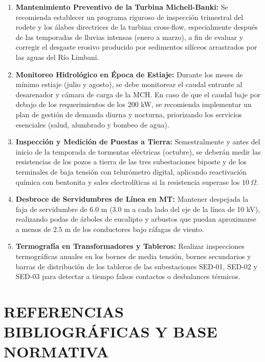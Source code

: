 \begin{enumerate}
  \item \textbf{Mantenimiento Preventivo de la Turbina Michell-Banki:} Se recomienda establecer un programa riguroso de inspección trimestral del rodete y los álabes directrices de la turbina cross-flow, especialmente después de las temporadas de lluvias intensas (enero a marzo), a fin de evaluar y corregir el desgaste erosivo producido por sedimentos silíceos arrastrados por las aguas del Río Limbani.
  \item \textbf{Monitoreo Hidrológico en Época de Estiaje:} Durante los meses de mínimo estiaje (julio y agosto), se debe monitorear el caudal entrante al desarenador y cámara de carga de la MCH. En caso de que el caudal baje por debajo de los requerimientos de los 200 kW, se recomienda implementar un plan de gestión de demanda diurna y nocturna, priorizando los servicios esenciales (salud, alumbrado y bombeo de agua).
  \item \textbf{Inspección y Medición de Puestas a Tierra:} Semestralmente y antes del inicio de la temporada de tormentas eléctricas (octubre), se deberán medir las resistencias de los pozos a tierra de las tres subestaciones biposte y de los terminales de baja tensión con telurómetro digital, aplicando reactivación química con bentonita y sales electrolíticas si la resistencia superase los $10\ \Omega$.
  \item \textbf{Desbroce de Servidumbres de Línea en MT:} Mantener despejada la faja de servidumbre de $6.0\text{ m}$ (3.0 m a cada lado del eje de la línea de 10 kV), realizando podas de árboles de eucalipto y arbustos que puedan aproximarse a menos de $2.5\text{ m}$ de los conductores bajo ráfagas de viento.
  \item \textbf{Termografía en Transformadores y Tableros:} Realizar inspecciones termográficas anuales en los bornes de media tensión, bornes secundarios y barras de distribución de los tableros de las subestaciones SED-01, SED-02 y SED-03 para detectar a tiempo falsos contactos o desbalances térmicos.
\end{enumerate}

\section{REFERENCIAS BIBLIOGRÁFICAS Y BASE NORMATIVA}

